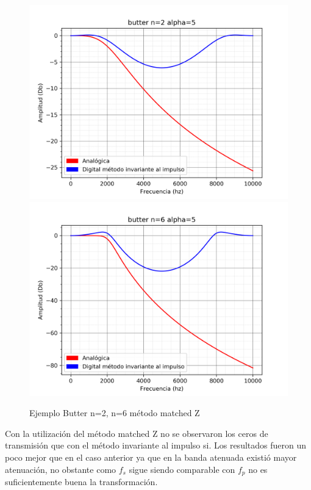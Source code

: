 \documentclass[assd_guia_filtros_recursivos_main.tex]{subfiles}
\begin{document}
\begin{figure}[H]	
	\centering
	\includegraphics[scale=0.4]{output/butter_matched_z/alpha=5/butter_n=2.png}
	\includegraphics[scale=0.4]{output/butter_matched_z/alpha=5/butter_n=6.png}
	\caption{Ejemplo Butter n=2, n=6 método matched Z}
	\label{fig:Caso 3}
\end{figure}

Con la utilización del método matched Z no se observaron los ceros de transmisión que con el método invariante al impulso si. Los resultados fueron un poco mejor que en el caso anterior ya que en la banda atenuada existió mayor atenuación, no obstante como $f_s$ sigue siendo comparable con $f_p$ no es suficientemente buena la transformación.
\end{document}
